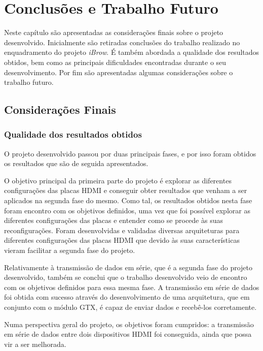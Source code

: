 \chapter{Conclusões e Trabalho Futuro} \label{chap:concl}

Neste capítulo são apresentadas as considerações finais sobre o projeto desenvolvido. Inicialmente são retiradas conclusões do trabalho realizado no enquadramento do projeto \textit{iBrow}. É também abordada a qualidade dos resultados obtidos, bem como as principais dificuldades encontradas durante o seu desenvolvimento. Por fim são apresentadas algumas considerações sobre o trabalho futuro.

\section{Considerações Finais} \label{chap6:cons_final}

\subsection*{Qualidade dos resultados obtidos}

O projeto desenvolvido passou por duas principais fases, e por isso foram obtidos os resultados que são de seguida apresentados.

O objetivo principal da primeira parte do projeto é explorar as diferentes configurações das placas HDMI e conseguir obter resultados que venham a ser aplicados na segunda fase do mesmo. Como tal, os resultados obtidos nesta fase foram encontro com os objetivos definidos, uma vez que foi possível explorar as diferentes configurações das placas e entender como se procede às suas reconfigurações. Foram desenvolvidas e validadas diversas arquiteturas para diferentes configurações das placas HDMI que devido às suas características vieram facilitar a segunda fase do projeto.

Relativamente à transmissão de dados em série, que é a segunda fase do projeto desenvolvido, também se conclui que o trabalho desenvolvido veio de encontro com os objetivos definidos para essa mesma fase. A transmissão em série de dados foi obtida com sucesso através do desenvolvimento de uma arquitetura, que em conjunto com o módulo GTX, é capaz de enviar dados e recebê-los corretamente.

Numa perspectiva geral do projeto, os objetivos foram cumpridos: a transmissão em série de dados entre dois dispositivos HDMI foi conseguida, ainda que possa vir a ser melhorada. 

